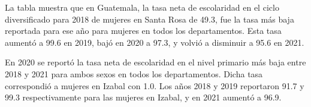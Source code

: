 La tabla muestra que en Guatemala, la tasa neta de escolaridad en el ciclo diversificado para 2018 de mujeres en Santa Rosa de 49.3, fue la tasa más baja reportada para ese año para mujeres en todos los departamentos. Esta tasa aumentó a 99.6 en 2019, bajó en 2020 a 97.3, y volvió a disminuir a 95.6 en 2021. 

En 2020 se reportó la tasa neta de escolaridad en el nivel primario más baja entre 2018 y 2021 para ambos sexos en todos los departamentos. Dicha tasa correspondió a mujeres en Izabal con 1.0. Los años 2018 y 2019 reportaron 91.7 y 99.3 respectivamente para las mujeres en Izabal, y en 2021 aumentó a 96.9.  